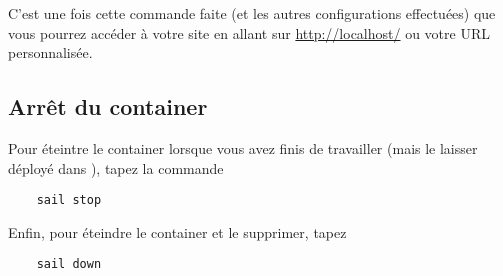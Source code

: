     C'est une fois cette commande faite (et les autres configurations effectuées) que vous pourrez accéder à votre site en allant sur \url{http://localhost/} ou votre URL personnalisée.

\subsection{Arrêt du container}

Pour éteintre le container lorsque vous avez finis de travailler (mais le laisser déployé dans \dockerdesktop), tapez la commande

\begin{lstlisting}
    sail stop
\end{lstlisting}

Enfin, pour éteindre le container et le supprimer, tapez

\begin{lstlisting}
    sail down
\end{lstlisting}